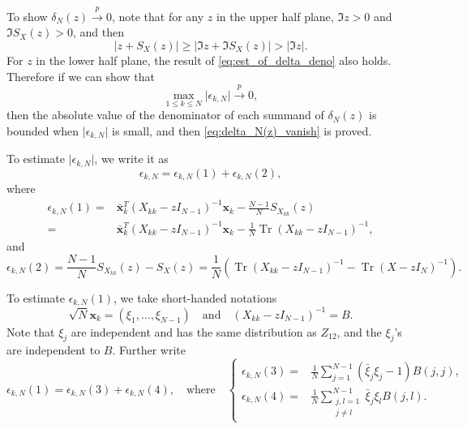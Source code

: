 \documentclass[11pt, a4paper]{article}
\numberwithin{equation}{section}
\newcommand{\toprobab}{\stackrel{p}{\rightarrow}}
\renewcommand{\vec}[1]{\mathbf{#1}}
\DeclareMathOperator{\Tr}{Tr}
\theoremstyle{definition}
\theoremstyle{remark}
\begin{document}
To show $\delta_N(z) \toprobab 0$, note that for any $z$ in the upper half plane, $\Im z > 0$ and $\Im S_X(z) > 0$, and then
\begin{equation} \label{eq:est_of_delta_deno}
  \lvert z + S_X(z) \rvert \geq \lvert \Im z + \Im S_X(z) \rvert > \lvert \Im z \rvert.
\end{equation}
For $z$ in the lower half plane, the result of \eqref{eq:est_of_delta_deno} also holds. Therefore if we can show that
\begin{equation}
  \max_{1 \leq k \leq N} \lvert \epsilon_{k, N} \rvert \toprobab 0,
\end{equation}
then the absolute value of the denominator of each summand of $\delta_N(z)$ is bounded when $\lvert \epsilon_{k, N} \rvert$ is small, and then \eqref{eq:delta_N(z)_vanish} is proved.

To estimate $\lvert \epsilon_{k, N} \rvert$, we write it as
\begin{equation}
  \epsilon_{k, N} = \epsilon_{k, N}(1) + \epsilon_{k, N}(2),
\end{equation}
where
\begin{equation}
  \begin{split}
    \epsilon_{k, N}(1) = {}& \bar{\vec{x}}^T_k (X_{kk} - zI_{N - 1})^{-1} \vec{x}_k - \frac{N - 1}{N} S_{X_{kk}}(z) \\
    = {}& \bar{\vec{x}}^T_k (X_{kk} - zI_{N - 1})^{-1} \vec{x}_k - \frac{1}{N}\Tr(X_{kk} - zI_{N - 1})^{-1},
  \end{split}
\end{equation}
and
\begin{equation}
  \epsilon_{k, N}(2) = \frac{N - 1}{N} S_{X_{kk}}(z) - S_X(z) = \frac{1}{N} \left( \Tr(X_{kk} - zI_{N - 1})^{-1} - \Tr(X - zI_N)^{-1} \right).
\end{equation}

To estimate $\epsilon_{k, N}(1)$, we take short-handed notations
\begin{equation}
  \sqrt{N}\vec{x}_k = (\xi_1, \dotsc, \xi_{N - 1}) \quad \text{and} \quad (X_{kk} - zI_{N - 1})^{-1} = B.
\end{equation}
Note that $\xi_j$ are independent and has the same distribution as $Z_{12}$, and the $\xi_j$'s are independent to $B$. Further write
\begin{equation}
  \epsilon_{k, N}(1) = \epsilon_{k, N}(3) + \epsilon_{k, N}(4), \quad \text{where} \quad \left\{ 
\begin{aligned}
  \epsilon_{k, N}(3) = {}& \frac{1}{N} \sum^{N - 1}_{j = 1} (\bar{\xi}_j \xi_j - 1) B(j, j), \\
  \epsilon_{k, N}(4) = {}& \frac{1}{N} \sum^{N - 1}_{\substack{j, l = 1 \\ j \neq l}} \bar{\xi}_j \xi_l B(j, l).
\end{aligned}
\right.
\end{equation}
\end{document}
